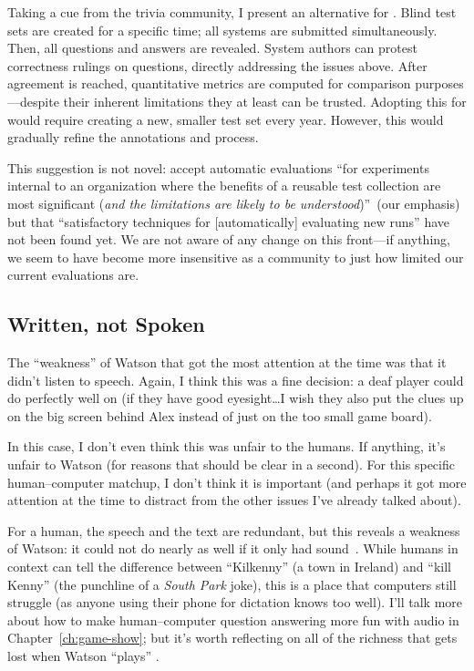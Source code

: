 
Taking a cue from the trivia community, I present an alternative
for .
Blind test sets are created for a specific time; all systems are submitted simultaneously.
Then, all questions and answers are revealed.
System authors can protest correctness rulings on questions, directly
addressing the issues above.
After agreement is reached,
quantitative metrics are computed for comparison purposes---despite their inherent limitations they at least can be
trusted.
Adopting this for  would require creating a new, smaller test
set every year.
However, this would gradually refine the annotations and process.

This suggestion is not novel: \citet{voorhees-00} accept automatic
evaluations ``for experiments internal to an organization where the
benefits of a reusable test collection are most significant (\emph{and
  the limitations are likely to be understood})''~(our emphasis) but
that ``satisfactory techniques for [automatically] evaluating new
runs'' have not been found yet.  We are not aware of any change on
this front---if anything, we seem to have become more insensitive as a
community to just how limited our current evaluations are.




\subsection{Written, not Spoken}

The ``weakness'' of Watson that got the most attention at the time was
that it didn't listen to speech.
%
Again, I think this was a fine decision: a deaf player could do
perfectly well on \jeopardy{} (if they have good eyesight\dots I
wish they also put the clues up on the big screen behind Alex
instead of just on the too small game board).

In this case, I don't even think this was unfair to the humans.
%
If anything, it's unfair to Watson (for reasons that should be clear
in a second).
%
For this specific human--computer matchup, I don't think it is
important (and perhaps it got more attention at the time to distract from the
other issues I've already talked about).

For a human, the speech and the text are redundant, but this reveals a
weakness of Watson: it could not do nearly as well if it only had
sound~\citep{Peskov-19}.
%
While humans in context can tell the difference between ``Kilkenny'' (a town in
Ireland) and ``kill Kenny'' (the punchline of a \textit{South Park}
joke), this is a place that computers still struggle (as anyone using
their phone for dictation knows too well).
%
I'll talk more about how to make human--computer question answering
more fun with audio in Chapter~\ref{ch:game-show}; but it's worth
reflecting on all of the richness that gets lost when Watson ``plays''
\jeopardyp{}.

